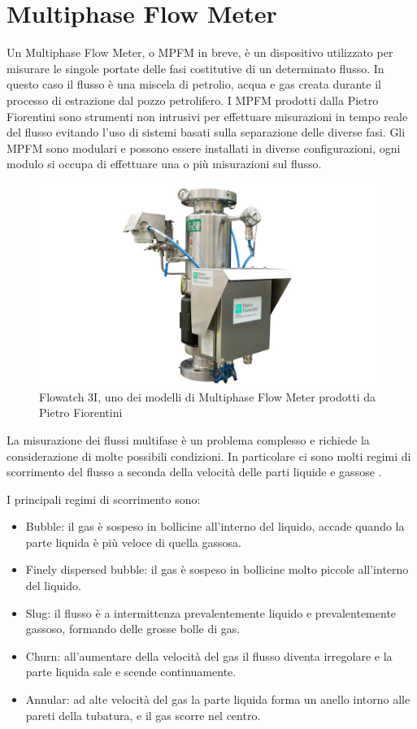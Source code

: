 \section{Multiphase Flow Meter} \label{multiphaseflowmeter}
Un Multiphase Flow Meter, o MPFM in breve, è un dispositivo utilizzato per misurare le singole portate delle fasi costitutive di un determinato flusso. In questo caso il flusso è una miscela di petrolio, acqua e gas creata durante il processo di estrazione dal pozzo petrolifero.
I MPFM prodotti dalla Pietro Fiorentini sono strumenti non intrusivi per effettuare misurazioni in tempo reale del flusso evitando l'uso di sistemi basati sulla separazione delle diverse fasi.
Gli MPFM sono modulari e possono essere installati in diverse configurazioni, ogni modulo si occupa di effettuare una o più misurazioni sul flusso.

\begin{figure}
	\includegraphics[width=\textwidth]{figures/mpfm}
	\caption[Multiphase Flow Meter]{
		Flowatch 3I, uno dei modelli di Multiphase Flow Meter prodotti da Pietro Fiorentini
		\label{fig:mpfm}}
\end{figure}


La misurazione dei flussi multifase è un problema complesso e richiede la considerazione di molte possibili condizioni. In particolare ci sono molti regimi di scorrimento del flusso a seconda della velocità delle parti liquide e gassose \cite{multiphaseIntroduction}.

I principali regimi di scorrimento sono:

\begin{itemize}
	\item{Bubble}: il gas è sospeso in bollicine all'interno del liquido, accade quando la parte liquida è più veloce di quella gassosa.
	\item{Finely dispersed bubble}: il gas è sospeso in bollicine molto piccole all'interno del liquido.
	\item{Slug}: il flusso è a intermittenza prevalentemente liquido e prevalentemente gassoso, formando delle grosse bolle di gas.
	\item{Churn}: all'aumentare della velocità del gas il flusso diventa irregolare e la parte liquida sale e scende continuamente.
	\item{Annular}: ad alte velocità del gas la parte liquida forma un anello intorno alle pareti della tubatura, e il gas scorre nel centro.
\end{itemize}

